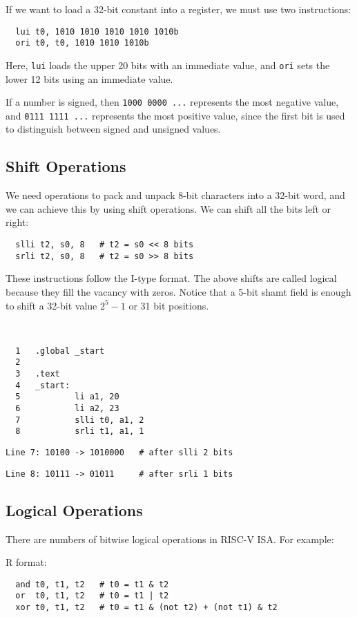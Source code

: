 If we want to load a 32-bit constant into a register, we must use two instructions:
\begin{verbatim}
  lui t0, 1010 1010 1010 1010 1010b
  ori t0, t0, 1010 1010 1010b
\end{verbatim}
Here, \verb|lui| loads the upper 20 bits with an immediate value, and \verb|ori| sets the lower 12 bits using an immediate value.

If a number is signed, then \verb|1000 0000 ...| represents the most negative value, and \verb|0111 1111 ...| represents the most positive value, since the first bit is used to distinguish between signed and unsigned values.

\subsection{Shift Operations}
We need operations to pack and unpack 8-bit characters into a 32-bit word, and we can achieve this by using shift operations. We can shift all the bits left or right:
\begin{verbatim}
  slli t2, s0, 8   # t2 = s0 << 8 bits
  srli t2, s0, 8   # t2 = s0 >> 8 bits
\end{verbatim}
These instructions follow the I-type format. The above shifts are called logical because they fill the vacancy with zeros. Notice that a 5-bit shamt field is enough to shift a 32-bit value  \(2^5 - 1\) or 31 bit positions. 

\begin{eg}~
\begin{verbatim}
  1   .global _start
  2
  3   .text
  4   _start:
  5           li a1, 20
  6           li a2, 23
  7           slli t0, a1, 2
  8           srli t1, a1, 1
\end{verbatim}

\verb|Line 7: 10100 -> 1010000   # after slli 2 bits|

\verb|Line 8: 10111 -> 01011     # after srli 1 bits|
\end{eg}

\subsection{Logical Operations}
There are numbers of bitwise logical operations in RISC-V ISA. For example: 

R format: 
\begin{verbatim}
  and t0, t1, t2   # t0 = t1 & t2
  or  t0, t1, t2   # t0 = t1 | t2
  xor t0, t1, t2   # t0 = t1 & (not t2) + (not t1) & t2
\end{verbatim}


